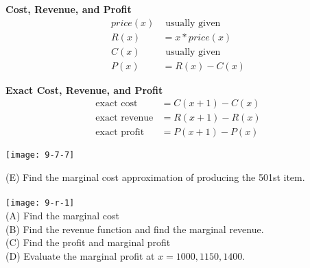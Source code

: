 \documentclass[14pt]{extarticle}
\begin{document}
\cleardoublepage

\begin{tcolorbox}[enhanced jigsaw,colback=bg,boxrule=0pt,arc=0pt]
	\textbf{Cost, Revenue, and Profit}
	\begin{align*}
		price(x)& \text{ usually given} \tag{price} \\
		R(x)&= x* price(x) \tag{revenue} \\
		C(x)& \text{ usually given} \tag{cost} \\
		P(x)&= R(x) - C(x)\tag{profit}
	\end{align*}
\end{tcolorbox}
\begin{tcolorbox}[enhanced jigsaw,colback=bg,boxrule=0pt,arc=0pt]
	\textbf{Exact Cost, Revenue, and Profit}
	\begin{align*}
		\text{exact cost} &= C(x+1)-C(x) \\
		\text{exact revenue} &= R(x+1) - R(x) \\
		\text{exact profit} &= P(x+1) - P(x)
	\end{align*}
\end{tcolorbox}


\begin{center}
	\texttt{[image: 9-7-7]}
\end{center}
(E) Find the marginal cost approximation of producing the 501st item.
\\
\\
\texttt{[image: 9-r-1]}
\\
(A) Find the marginal cost\\
(B) Find the revenue function and find the marginal revenue.\\
(C) Find the profit and marginal profit\\
(D) Evaluate the marginal profit at $x=1000, 1150, 1400$.

\cleardoublepage
\end{document}
